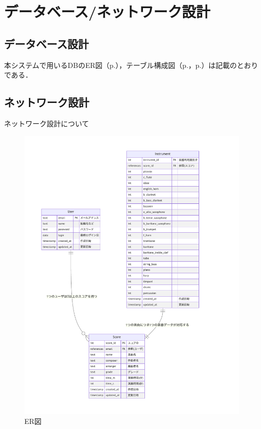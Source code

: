 \chapter{データベース/ネットワーク設計}
\section*{データベース設計}
本システムで用いるDBのER図（p.\pageref{fig:ER図}），テーブル構成図（p.\pageref{tableDesgin1}，p.\pageref{tableDesgin2}）は記載のとおりである．
\section*{ネットワーク設計}
\begin{framed}
    \vspace{1cm}
    \begin{center}
        ネットワーク設計について
    \end{center}
    \vspace{1cm}
\end{framed}
\begin{figure}[p]
    \centering
    \includegraphics[keepaspectratio,height=.9\textheight]{db-nwDesign/er.pdf}
    \caption{ER図}
    \label{fig:ER図}
\end{figure}

